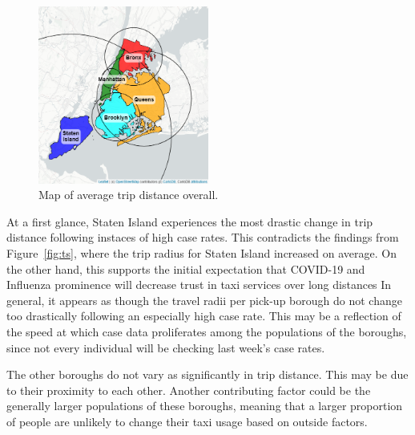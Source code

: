 \documentclass[11pt]{article}
\begin{document}
\begin{multicols}{2}
    \begin{figure}[H]

        \centering
    
        \includegraphics[width=0.5\textwidth]{../plots/cropped-map-avg-trip-distance-overall-pu_borough.png}
    
        \caption{Map of average trip distance overall.} 
        \label{map:overall}
    \end{figure}
    
    At a first glance, Staten Island experiences the most drastic change in trip distance following instaces of high case rates.
    This contradicts the findings from Figure~\ref{fig:ts}, where the trip radius for Staten Island increased on average.
    On the other hand, this supports the initial expectation that COVID-19 and Influenza prominence will decrease trust in taxi services over long distances
    In general, it appears as though the travel radii per pick-up borough do not change too drastically following an especially high case rate.
    This may be a reflection of the speed at which case data proliferates among the populations of the boroughs,
    since not every individual will be checking last week's case rates.

    The other boroughs do not vary as significantly in trip distance.
    This may be due to their proximity to each other.
    Another contributing factor could be the generally larger populations of these boroughs,
    meaning that a larger proportion of people are unlikely to change their taxi usage based on outside factors.

\end{multicols}
\end{document}
